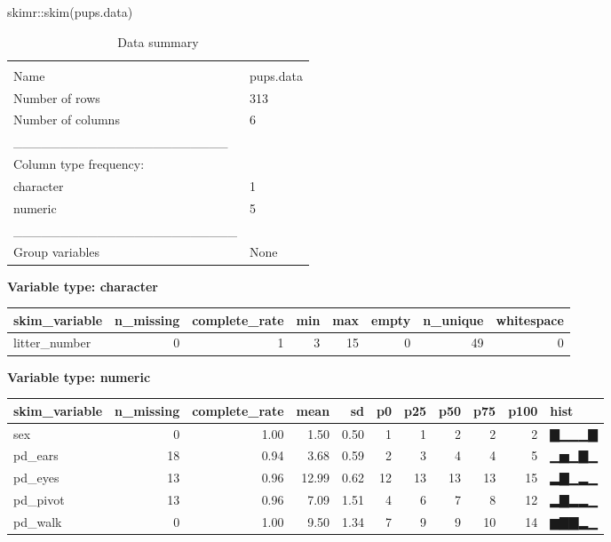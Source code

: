 \documentclass[
]{article}
\newenvironment{Shaded}{\begin{snugshade}}{\end{snugshade}}
\newcommand{\FunctionTok}[1]{\textcolor[rgb]{0.00,0.00,0.00}{#1}}
\newcommand{\NormalTok}[1]{#1}
\newcommand{\SpecialCharTok}[1]{\textcolor[rgb]{0.00,0.00,0.00}{#1}}
\begin{document}
\begin{Shaded}
\begin{Highlighting}[]
\NormalTok{skimr}\SpecialCharTok{::}\FunctionTok{skim}\NormalTok{(pups.data)}
\end{Highlighting}
\end{Shaded}

\begin{longtable}[]{@{}ll@{}}
\caption{Data summary}\tabularnewline
\toprule
& \\
\midrule
\endfirsthead
\toprule
& \\
\midrule
\endhead
Name & pups.data \\
Number of rows & 313 \\
Number of columns & 6 \\
\_\_\_\_\_\_\_\_\_\_\_\_\_\_\_\_\_\_\_\_\_\_\_ & \\
Column type frequency: & \\
character & 1 \\
numeric & 5 \\
\_\_\_\_\_\_\_\_\_\_\_\_\_\_\_\_\_\_\_\_\_\_\_\_ & \\
Group variables & None \\
\bottomrule
\end{longtable}

\textbf{Variable type: character}

\begin{longtable}[]{@{}lrrrrrrr@{}}
\toprule
skim\_variable & n\_missing & complete\_rate & min & max & empty &
n\_unique & whitespace \\
\midrule
\endhead
litter\_number & 0 & 1 & 3 & 15 & 0 & 49 & 0 \\
\bottomrule
\end{longtable}

\textbf{Variable type: numeric}

\begin{longtable}[]{@{}lrrrrrrrrrl@{}}
\toprule
skim\_variable & n\_missing & complete\_rate & mean & sd & p0 & p25 &
p50 & p75 & p100 & hist \\
\midrule
\endhead
sex & 0 & 1.00 & 1.50 & 0.50 & 1 & 1 & 2 & 2 & 2 & ▇▁▁▁▇ \\
pd\_ears & 18 & 0.94 & 3.68 & 0.59 & 2 & 3 & 4 & 4 & 5 & ▁▅▁▇▁ \\
pd\_eyes & 13 & 0.96 & 12.99 & 0.62 & 12 & 13 & 13 & 13 & 15 & ▂▇▁▂▁ \\
pd\_pivot & 13 & 0.96 & 7.09 & 1.51 & 4 & 6 & 7 & 8 & 12 & ▂▇▂▂▁ \\
pd\_walk & 0 & 1.00 & 9.50 & 1.34 & 7 & 9 & 9 & 10 & 14 & ▆▇▇▂▁ \\
\bottomrule
\end{longtable}
\end{document}
